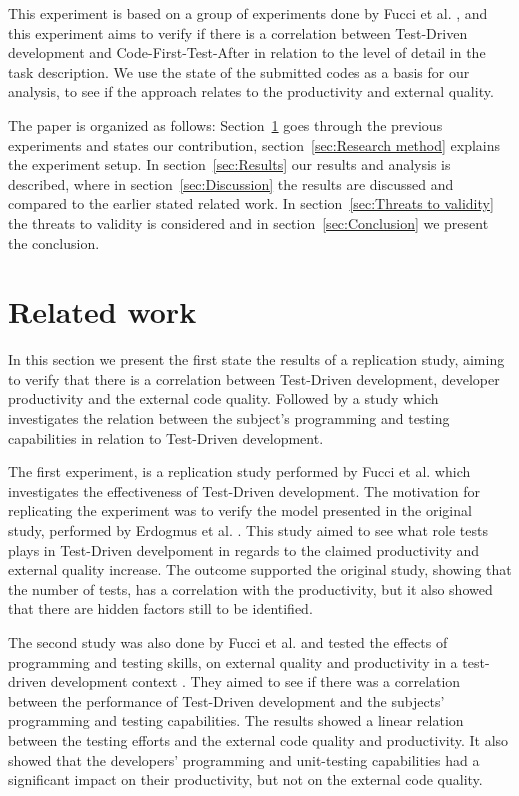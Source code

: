 \documentclass{sig-alternate-05-2015}
\begin{document}
This experiment is based on a group of experiments done by Fucci et al. \cite{fucci2}, and this experiment aims to verify if there is a correlation between Test-Driven development and Code-First-Test-After in relation to the level of detail in the task description. We use the state of the submitted codes as a basis for our analysis, to see if the approach relates to the productivity and external quality.

The paper is organized as follows: Section~\ref{sec:Related work} goes through the previous experiments and states our contribution, section~\ref{sec:Research method} explains the experiment setup. In section~\ref{sec:Results} our results and analysis is described, where in section~\ref{sec:Discussion} the results are discussed and compared to the earlier stated related work. In section~\ref{sec:Threats to validity} the threats to validity is considered and in section~\ref{sec:Conclusion} we present the conclusion. 

\section{Related work}
\label{sec:Related work}
In this section we present the first state the results of a replication study, aiming to verify that there is a correlation between Test-Driven development, developer productivity and the external code quality. Followed by a study which investigates the relation between the subject's programming and testing capabilities in relation to Test-Driven development.

The first experiment, is a replication study performed by Fucci et al. \cite{fucci2} which investigates the effectiveness of Test-Driven development. The motivation for replicating the experiment was to verify the model presented in the original study, performed by Erdogmus et al. \cite{erdogmus1}. This study aimed to see what role tests plays in Test-Driven develpoment in regards to the claimed productivity and external quality increase. The outcome supported the original study, showing that the number of tests, has a correlation with the productivity, but it also showed that there are hidden factors still to be identified.

The second study was also done by Fucci et al. and tested the effects of programming and testing skills, on external quality and productivity in a test-driven development context \cite{fucci1}. They aimed to see if there was a correlation between the performance of Test-Driven development and the subjects' programming and testing capabilities. The results showed a linear relation between the testing efforts and the external code quality and productivity. It also showed that the developers' programming and unit-testing capabilities had a significant impact on their productivity, but not on the external code quality.
\end{document}
